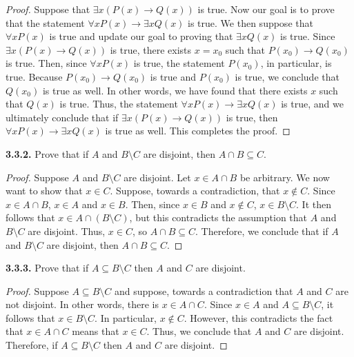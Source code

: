 \documentclass[12pt]{amsart}
\newenvironment{statement}[1]{\smallskip\noindent\color[rgb]{.6627, .3529, .6314} {\bf #1.}}{}
\theoremstyle{definition}
\theoremstyle{remark}
\begin{document}
\begin{proof}
Suppose that $\exists x (P(x) \rightarrow Q(x))$ is true.
Now our goal is to prove that the statement $\forall x P(x) \rightarrow \exists x Q(x)$ is true.
We then suppose that $\forall x P(x)$ is true and update our goal to proving that $\exists x Q(x)$ is true.
Since $\exists x (P(x) \rightarrow Q(x))$ is true, there exists $x = x_0$ such that $P(x_0) \rightarrow Q(x_0)$ is true.
Then, since $\forall x P(x)$ is true, the statement $P(x_0)$, in particular, is true.
Because $P(x_0) \rightarrow Q(x_0)$ is true and $P(x_0)$ is true, we conclude that $Q(x_0)$ is true as well.
In other words, we have found that there exists $x$ such that $Q(x)$ is true.
Thus, the statement $\forall x P(x) \rightarrow \exists x Q(x)$ is true, and we ultimately conclude that if $\exists x (P(x) \rightarrow Q(x))$ is true, then $\forall x P(x) \rightarrow \exists x Q(x)$ is true as well.
This completes the proof.
\end{proof}


\begin{statement}{3.3.2}
Prove that if $A$ and $B \setminus C$ are disjoint, then $A \cap B \subseteq C$.
\end{statement}

\begin{proof}
Suppose $A$ and $B \setminus C$ are disjoint.
Let $x \in A \cap B$ be arbitrary.
We now want to show that $x \in C$.
Suppose, towards a contradiction, that $x \notin C$.
Since $x \in A \cap B$, $x \in A$ and $x \in B$.
Then, since $x \in B$ and $x \notin C$, $x \in B \setminus C$.
It then follows that $x \in A \cap (B \setminus C)$, but this contradicts the assumption that $A$ and $B \setminus C$ are disjoint.
Thus, $x \in C$, so $A \cap B \subseteq C$.
Therefore, we conclude that if $A$ and $B \setminus C$ are disjoint, then $A \cap B \subseteq C$.
\end{proof}


\begin{statement}{3.3.3}
Prove that if $A \subseteq B \setminus C$ then $A$ and $C$ are disjoint.
\end{statement}

\begin{proof}
Suppose $A \subseteq B \setminus C$ and suppose, towards a contradiction that $A$ and $C$ are not disjoint.
In other words, there is $x \in A \cap C$.
Since $x \in A$ and $A \subseteq B \setminus C$, it follows that $x \in B \setminus C$.
In particular, $x \notin C$.
However, this contradicts the fact that $x \in A \cap C$ means that $x \in C$.
Thus, we conclude that $A$ and $C$ are disjoint.
Therefore, if $A \subseteq B \setminus C$ then $A$ and $C$ are disjoint.
\end{proof}
\end{document}
